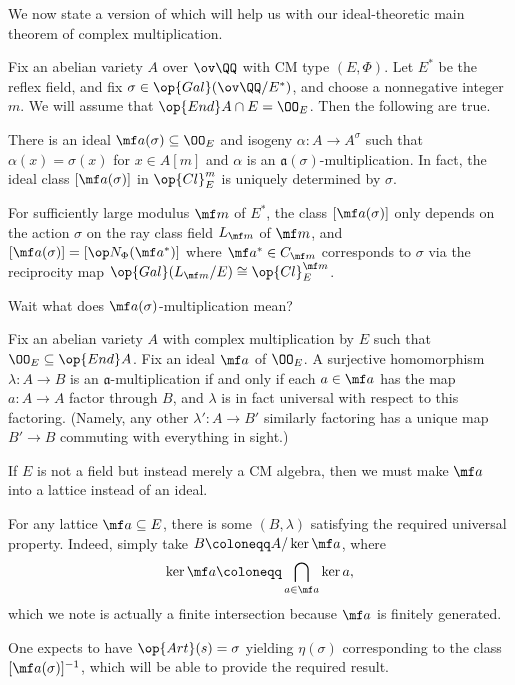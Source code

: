 \documentclass[../notes.tex]{subfiles}
\begin{document}
We now state a version of  which will help us with our ideal-theoretic main theorem of complex multiplication.
\begin{theorem} \label{thm:ideal-theoretic-main}
	Fix an abelian variety $A$ over $\ov\QQ$ with CM type $(E,\Phi)$. Let $E^*$ be the reflex field, and fix $\sigma\in\op{Gal}(\ov\QQ/E^*)$, and choose a nonnegative integer $m$. We will assume that $\op{End}A\cap E=\OO_E$. Then the following are true.
	\begin{listalph}
		\item There is an ideal $\mf a(\sigma)\subseteq\OO_E$ and isogeny $\alpha\colon A\to A^\sigma$ such that $\alpha(x)=\sigma(x)$ for $x\in A[m]$ and $\alpha$ is an $\mathfrak a(\sigma)$-multiplication. In fact, the ideal class $[\mf a(\sigma)]$ in $\op{Cl}^{m}_E$ is uniquely determined by $\sigma$.
		\item For sufficiently large modulus $\mf m$ of $E^*$, the class $[\mf a(\sigma)]$ only depends on the action $\sigma$ on the ray class field $L_{\mf m}$ of $\mf m$, and $[\mf a(\sigma)]=[\op N_\Phi(\mf a^*)]$ where $\mf a^*\in C_{\mf m}$ corresponds to $\sigma$ via the reciprocity map $\op{Gal}(L_{\mf m}/E)\cong\op{Cl}^{\mf m}_E$.
	\end{listalph}
\end{theorem}
Wait what does $\mf a(\sigma)$-multiplication mean?
\begin{definition}
	Fix an abelian variety $A$ with complex multiplication by $E$ such that $\OO_E\subseteq\op{End}A$. Fix an ideal $\mf a$ of $\OO_E$. A surjective homomorphism $\lambda\colon A\to B$ is an $\mathfrak a$-multiplication if and only if each $a\in\mf a$ has the map $a\colon A\to A$ factor through $B$, and $\lambda$ is in fact universal with respect to this factoring. (Namely, any other $\lambda'\colon A\to B'$ similarly factoring has a unique map $B'\to B$ commuting with everything in sight.)
\end{definition}
\begin{remark}
	If $E$ is not a field but instead merely a CM algebra, then we must make $\mf a$ into a lattice instead of an ideal.
\end{remark}
\begin{remark}
	For any lattice $\mf a\subseteq E$, there is some $(B,\lambda)$ satisfying the required universal property. Indeed, simply take $B\coloneqq A/\ker\mf a$, where
	\[\ker\mf a\coloneqq\bigcap_{a\in\mf a}\ker a,\]
	which we note is actually a finite intersection because $\mf a$ is finitely generated.
\end{remark}
\begin{remark}
	One expects to have $\op{Art}(s)=\sigma$ yielding $\eta(\sigma)$ corresponding to the class $[\mf a(\sigma)]^{-1}$, which will be able to provide the required result.
\end{remark}
\end{document}
